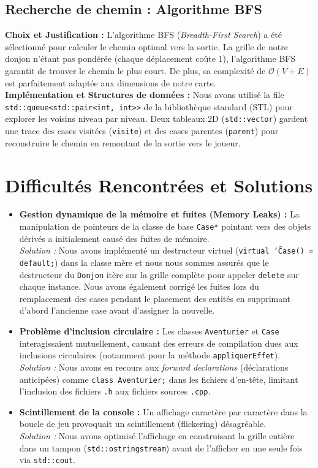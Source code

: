 \documentclass[11pt,a4paper]{article}
\begin{document}
\subsection{Recherche de chemin : Algorithme BFS}
\textbf{Choix et Justification :} L'algorithme BFS (\textit{Breadth-First Search}) a été sélectionné pour calculer le chemin optimal vers la sortie. La grille de notre donjon n'étant pas pondérée (chaque déplacement coûte 1), l'algorithme BFS garantit de trouver le chemin le plus court. De plus, sa complexité de $\mathcal{O}(V + E)$ est parfaitement adaptée aux dimensions de notre carte.
\\
\textbf{Implémentation et Structures de données :} Nous avons utilisé la file \texttt{std::queue<std::pair<int, int>>} de la bibliothèque standard (STL) pour explorer les voisins niveau par niveau. Deux tableaux 2D (\texttt{std::vector}) gardent une trace des cases visitées (\texttt{visite}) et des cases parentes (\texttt{parent}) pour reconstruire le chemin en remontant de la sortie vers le joueur.

\section{Difficultés Rencontrées et Solutions}
\begin{itemize}
    \item \textbf{Gestion dynamique de la mémoire et fuites (Memory Leaks) :} La manipulation de pointeurs de la classe de base \texttt{Case*} pointant vers des objets dérivés a initialement causé des fuites de mémoire. \\
    \textit{Solution :} Nous avons implémenté un destructeur virtuel (\texttt{virtual \char`\~Case() = default;}) dans la classe mère et nous nous sommes assurés que le destructeur du \texttt{Donjon} itère sur la grille complète pour appeler \texttt{delete} sur chaque instance. Nous avons également corrigé les fuites lors du remplacement des cases pendant le placement des entités en supprimant d'abord l'ancienne case avant d'assigner la nouvelle.
    \item \textbf{Problème d'inclusion circulaire :} Les classes \texttt{Aventurier} et \texttt{Case} interagissaient mutuellement, causant des erreurs de compilation dues aux inclusions circulaires (notamment pour la méthode \texttt{appliquerEffet}). \\
    \textit{Solution :} Nous avons eu recours aux \textit{forward declarations} (déclarations anticipées) comme \texttt{class Aventurier;} dans les fichiers d'en-tête, limitant l'inclusion des fichiers \texttt{.h} aux fichiers sources \texttt{.cpp}.
    \item \textbf{Scintillement de la console :} Un affichage caractère par caractère dans la boucle de jeu provoquait un scintillement (flickering) désagréable. \\
    \textit{Solution :} Nous avons optimisé l'affichage en construisant la grille entière dans un tampon (\texttt{std::ostringstream}) avant de l'afficher en une seule fois via \texttt{std::cout}.
\end{itemize}
\end{document}
